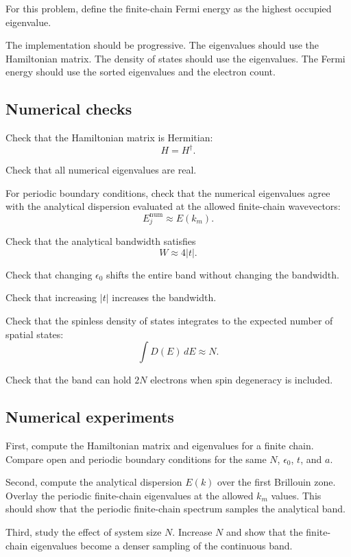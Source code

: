 For this problem, define the finite-chain Fermi energy as the highest occupied eigenvalue.

The implementation should be progressive. The eigenvalues should use the Hamiltonian matrix. The density of states should use the eigenvalues. The Fermi energy should use the sorted eigenvalues and the electron count.

\subsection{Numerical checks}

Check that the Hamiltonian matrix is Hermitian:
\[
H=H^\dagger.
\]

Check that all numerical eigenvalues are real.

For periodic boundary conditions, check that the numerical eigenvalues agree with the analytical dispersion evaluated at the allowed finite-chain wavevectors:
\[
E_j^{\mathrm{num}}
\approx
E(k_m).
\]

Check that the analytical bandwidth satisfies
\[
W\approx4|t|.
\]

Check that changing \(\epsilon_0\) shifts the entire band without changing the bandwidth.

Check that increasing \(|t|\) increases the bandwidth.

Check that the spinless density of states integrates to the expected number of spatial states:
\[
\int D(E)\,dE\approx N.
\]

Check that the band can hold \(2N\) electrons when spin degeneracy is included.

\subsection{Numerical experiments}

First, compute the Hamiltonian matrix and eigenvalues for a finite chain. Compare open and periodic boundary conditions for the same \(N\), \(\epsilon_0\), \(t\), and \(a\).

Second, compute the analytical dispersion \(E(k)\) over the first Brillouin zone. Overlay the periodic finite-chain eigenvalues at the allowed \(k_m\) values. This should show that the periodic finite-chain spectrum samples the analytical band.

Third, study the effect of system size \(N\). Increase \(N\) and show that the finite-chain eigenvalues become a denser sampling of the continuous band.

